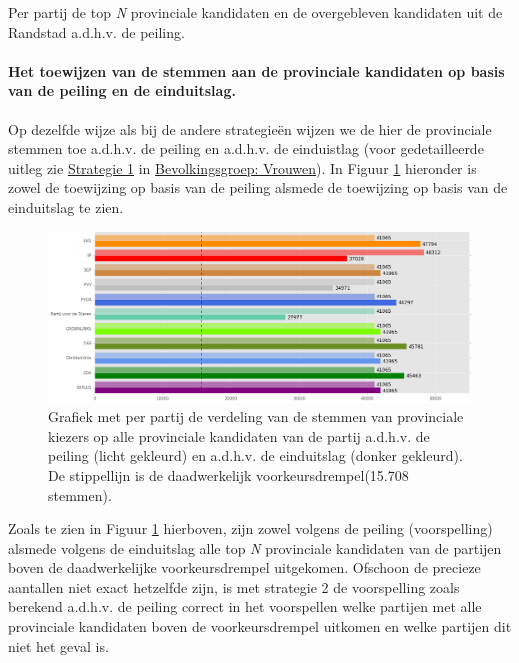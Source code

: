 \begin{table}[h]
\centering
	\begin{footnotesize}
		
	\end{footnotesize}
			\caption{Per partij de top \textit{N} provinciale kandidaten en de overgebleven kandidaten uit de Randstad a.d.h.v. de peiling.}
\label{table:tab3P} 
\end{table}



\paragraph{Het toewijzen van de stemmen aan de provinciale kandidaten op basis van de peiling en de einduitslag.}
Op dezelfde wijze als bij de andere strategie\"{e}n wijzen we de hier de provinciale stemmen toe a.d.h.v. de peiling en a.d.h.v. de einduistlag (voor gedetailleerde uitleg zie \hyperref[S1V]{Strategie 1} in \hyperref[vrouwen]{Bevolkingsgroep: Vrouwen}). In Figuur \ref{fig:stemmenS1P} hieronder is zowel de toewijzing op basis van de peiling alsmede de toewijzing op basis van de einduitslag te zien.



\begin{figure}[H]

	\includegraphics[width=\linewidth]	{stemmen_op_provincialen_topN_samen.png}

			\caption{Grafiek met per partij de verdeling van de stemmen van provinciale kiezers op alle provinciale kandidaten van de partij a.d.h.v. de peiling (licht gekleurd) en a.d.h.v. de einduitslag (donker gekleurd). De stippellijn is de daadwerkelijk voorkeursdrempel(15.708 stemmen).}

\label{fig:stemmenS1P}
\end{figure}


Zoals te zien in Figuur \ref{fig:stemmenS1P} hierboven, zijn zowel volgens de peiling (voorspelling) alsmede volgens de einduitslag alle top \textit{N} provinciale kandidaten van de partijen boven de daadwerkelijke voorkeursdrempel uitgekomen. Ofschoon de precieze aantallen niet exact hetzelfde zijn, is met strategie 2 de voorspelling zoals berekend a.d.h.v. de peiling correct in het voorspellen welke partijen met alle provinciale kandidaten boven de voorkeursdrempel uitkomen en welke partijen dit niet het geval is.

